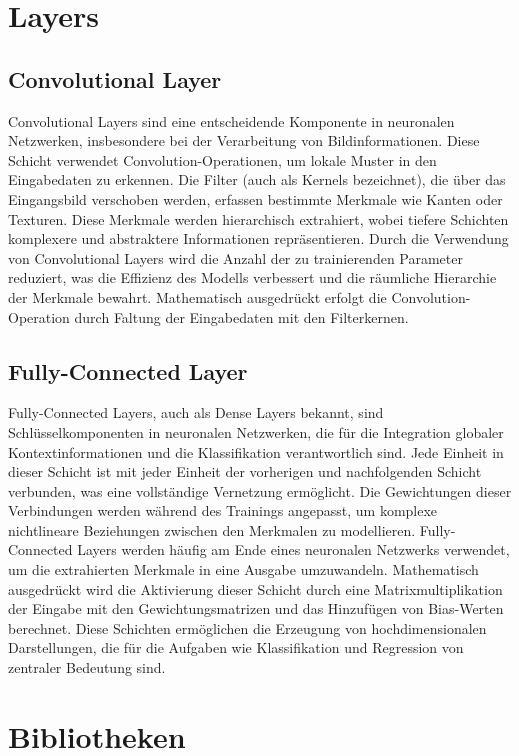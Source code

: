 \section{Layers}
\subsection{Convolutional Layer}
Convolutional Layers sind eine entscheidende Komponente in neuronalen Netzwerken, insbesondere bei der Verarbeitung von Bildinformationen. Diese Schicht verwendet Convolution-Operationen, um lokale Muster in den Eingabedaten zu erkennen. Die Filter (auch als Kernels bezeichnet), die über das Eingangsbild verschoben werden, erfassen bestimmte Merkmale wie Kanten oder Texturen. Diese Merkmale werden hierarchisch extrahiert, wobei tiefere Schichten komplexere und abstraktere Informationen repräsentieren. Durch die Verwendung von Convolutional Layers wird die Anzahl der zu trainierenden Parameter reduziert, was die Effizienz des Modells verbessert und die räumliche Hierarchie der Merkmale bewahrt. Mathematisch ausgedrückt erfolgt die Convolution-Operation durch Faltung der Eingabedaten mit den Filterkernen.

\subsection{Fully-Connected Layer}
Fully-Connected Layers, auch als Dense Layers bekannt, sind Schlüsselkomponenten in neuronalen Netzwerken, die für die Integration globaler Kontextinformationen und die Klassifikation verantwortlich sind. Jede Einheit in dieser Schicht ist mit jeder Einheit der vorherigen und nachfolgenden Schicht verbunden, was eine vollständige Vernetzung ermöglicht. Die Gewichtungen dieser Verbindungen werden während des Trainings angepasst, um komplexe nichtlineare Beziehungen zwischen den Merkmalen zu modellieren. Fully-Connected Layers werden häufig am Ende eines neuronalen Netzwerks verwendet, um die extrahierten Merkmale in eine Ausgabe umzuwandeln. Mathematisch ausgedrückt wird die Aktivierung dieser Schicht durch eine Matrixmultiplikation der Eingabe mit den Gewichtungsmatrizen und das Hinzufügen von Bias-Werten berechnet. Diese Schichten ermöglichen die Erzeugung von hochdimensionalen Darstellungen, die für die Aufgaben wie Klassifikation und Regression von zentraler Bedeutung sind.

\section{Bibliotheken}
